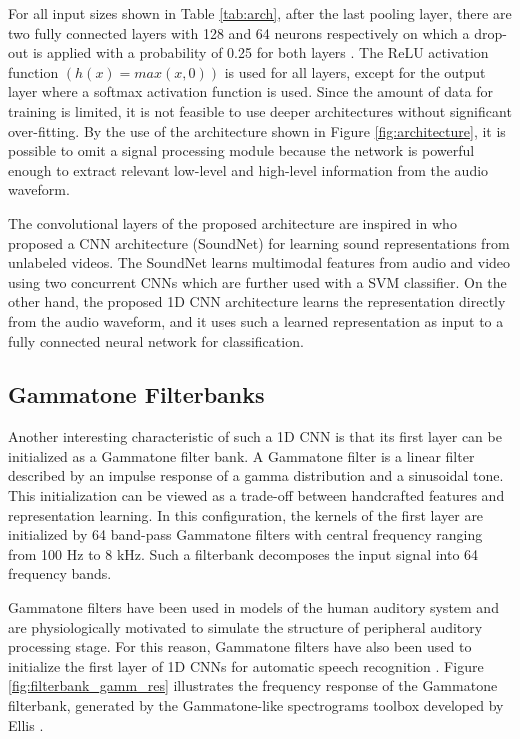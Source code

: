 \documentclass[preprint,final,12pt]{elsarticle}
\begin{document}
For all input sizes shown in Table \ref{tab:arch}, after the last pooling layer, there are two fully connected layers with 128 and 64 neurons respectively on which a drop-out is applied with a probability of 0.25 for both layers \citep{srivastava2014dropout}. The ReLU activation function $(h(x)=max(x,0))$ is used for all layers, except for the output layer where a softmax activation function is used. Since the amount of data for training is limited, it is not feasible to use deeper architectures without significant over-fitting. By the use of the architecture shown in Figure \ref{fig:architecture}, it is possible to omit a signal processing module because the network is powerful enough to extract relevant low-level and high-level information from the audio waveform.

The convolutional layers of the proposed architecture are inspired in \citet{aytar2016soundnet} who proposed a CNN architecture (SoundNet) for learning sound representations from unlabeled videos. The SoundNet \citep{aytar2016soundnet} learns multimodal features from audio and video using two concurrent CNNs which are further used with a SVM classifier. On the other hand, the proposed 1D CNN architecture learns the representation directly from the audio waveform, and it uses such a learned representation as input to a fully connected neural network for classification.

\subsection{Gammatone Filterbanks}
\label{sub:gamma}
Another interesting characteristic of such a 1D CNN is that its first layer can be initialized as a Gammatone filter bank. A Gammatone filter is a linear filter described by an impulse response of a gamma distribution and a sinusoidal tone. This initialization can be viewed as a trade-off between handcrafted features and representation learning. In this configuration, the kernels of the first layer are initialized by 64 band-pass Gammatone filters with central frequency ranging from 100 Hz to 8 kHz. Such a filterbank decomposes the input signal into 64 frequency bands.

Gammatone filters have been used in models of the human auditory system and are physiologically motivated to simulate the structure of peripheral auditory processing stage. For this reason, Gammatone filters have also been used to initialize the first layer of 1D CNNs for automatic speech recognition \citep{hoshen2015speech,Zeghidour2018,sainath2015learning}. Figure \ref{fig:filterbank_gamm_res} illustrates the frequency response of the Gammatone filterbank, generated by the Gammatone-like spectrograms toolbox developed by Ellis \citep{ellistoolbox:2009}.
\end{document}
